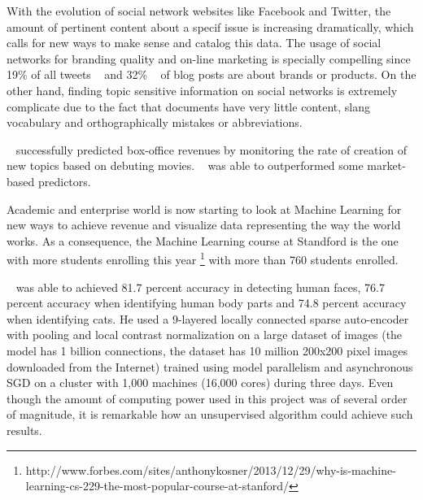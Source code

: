  With the evolution of social network websites like Facebook and Twitter, the amount of pertinent content about a specif issue is increasing dramatically, which calls for new ways to make sense and catalog this data.
The usage of social networks for branding quality and on-line marketing is specially compelling since 19\% of all tweets ~\cite{Jansen2009} and 32\% ~\cite{Melville2009} of blog posts are about brands or products.
On the other hand, finding topic sensitive information on social networks is extremely complicate due to the fact that documents have very little content, slang vocabulary and orthographically mistakes or abbreviations.

~\citet{Asur2010} successfully predicted box-office revenues by monitoring the rate of creation of new topics based on debuting movies. ~\citet{Asur2010} was able to outperformed some market-based predictors.

Academic and enterprise world is now starting to look at Machine Learning for new ways to achieve revenue and visualize data representing the way the world works. 
As a consequence, the Machine Learning course at Standford is the one with more students enrolling this year \footnote{http://www.forbes.com/sites/anthonykosner/2013/12/29/why-is-machine-learning-cs-229-the-most-popular-course-at-stanford/} with more than 760 students enrolled.

 ~\cite{Le2011} was able to achieved 81.7 percent accuracy in detecting human faces, 76.7 percent accuracy when identifying human body parts and 74.8 percent accuracy when identifying cats. He used a 9-layered locally connected sparse auto-encoder with pooling and local contrast normalization on a large dataset of images (the model has 1 billion connections, the dataset has 10 million 200x200 pixel images downloaded from the Internet) trained using model parallelism and asynchronous SGD on a cluster with 1,000 machines (16,000 cores) during three days. Even though the amount of computing power used in this project was of several order of magnitude, it is remarkable how an unsupervised algorithm could achieve such results.

